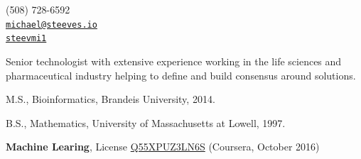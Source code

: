 \documentclass[11pt,article,oneside]{memoir}
\makeatletter
\def\myemail{michael@steeves.io}
\def\myphone{(508) 728-6592}
\def\mytwitter{@steevmi1}
\def\mygit{steevmi1}
\makeatother
\begin{document}
\begin{minipage}[t]{2.95in}

\end{minipage}
\hfill
\hfill
\begin{minipage}[t]{1.3in}
  \flushright \footnotesize  \addressblock \myphone \, \faPhone \\
  {\scriptsize  \texttt{\href{mailto:\myemail}{\myemail}} \, \faEnvelope} \\
  {\scriptsize  \texttt{\href{\mygit}{\mygit}} \, \faGithub}
\end{minipage}

\medskip

\reversemarginpar

\bigskip



\ind Senior technologist with extensive experience working in the life sciences and pharmaceutical industry helping to define and build consensus around solutions.

\bigskip




\ind M.S., Bioinformatics, Brandeis University, 2014.

\ind B.S., Mathematics, University of Massachusetts at Lowell, 1997.

\bigskip


\ind \textbf{Machine Learing}, License \href{https://www.coursera.org/account/accomplishments/verify/Q55XPUZ3LN6S}{Q55XPUZ3LN6S} (Coursera, October 2016)
\end{document}
